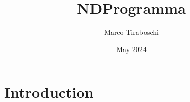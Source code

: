 \documentclass{article}
\title{NDProgramma}
\author{Marco Tiraboschi}
\date{May 2024}
\begin{document}
\maketitle

\section{Introduction}
\end{document}
